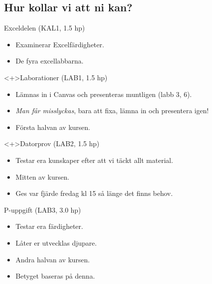 \subsection{Hur kollar vi att ni kan?}

\begin{frame}
  \begin{block}{Exceldelen (KAL1, 1.5 hp)}
    \begin{itemize}
      \item Examinerar Excelfärdigheter.
      \item De fyra excellabbarna.
    \end{itemize}
  \end{block}
\end{frame}

\begin{frame}
  \begin{block}<+>{Laborationer (LAB1, 1.5 hp)}
    \begin{itemize}
      \item Lämnas in i Canvas och presenteras muntligen (labb 3, 6).
      \item \emph{Man får misslyckas}, bara att fixa, lämna in och presentera 
        igen!
      \item Första halvan av kursen.
    \end{itemize}
  \end{block}

  \begin{block}<+>{Datorprov (LAB2, 1.5 hp)}
    \begin{itemize}
      \item Testar era kunskaper efter att vi täckt allt material.
      \item Mitten av kursen.
      \item Ges var fjärde fredag kl 15 så länge det finns behov.
    \end{itemize}
  \end{block}
\end{frame}

\begin{frame}
  \begin{block}{P-uppgift (LAB3, 3.0 hp)}
    \begin{itemize}
      \item Testar era färdigheter.
      \item Låter er utvecklas djupare.
      \item Andra halvan av kursen.
      \item Betyget baseras på denna.
    \end{itemize}
  \end{block}
\end{frame}


